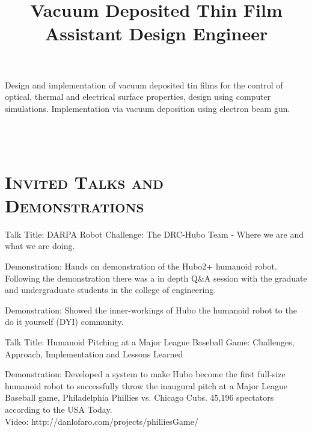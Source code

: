 \begin{resume}
\title{Vacuum Deposited Thin Film Assistant Design Engineer}
\begin{position}
Design and implementation of vacuum deposited tin films for the control of optical, thermal and electrical surface
properties, design using computer simulations.  Implementation via vacuum deposition using electron beam gun.
\end{position}


\begin{formatb}
  \\
  \body\\
\end{formatb}

\section{\textsc{Invited Talks and Demonstrations}}

\begin{position}
Talk Title: DARPA Robot Challenge: The DRC-Hubo Team - Where we are and what we are doing.
\end{position}

\begin{position}
Demonstration: Hands on demonstration of the Hubo2+ humanoid robot.  Following the demonstration there was a in depth Q\&A session with the graduate and undergraduate students in the college of engineering. 
\end{position}

\begin{position}
Demonstration: Showed the inner-workings of Hubo the humanoid robot to the do it yourself (DYI) community. 
\end{position}



\begin{position}
Talk Title: Humanoid Pitching at a Major League Baseball Game: Challenges, Approach, Implementation and Lessons Learned
\end{position}



\begin{position}
Demonstration: Developed a system to make Hubo become the first full-size humanoid robot to successfully throw the inaugural pitch at a Major League Baseball game, Philadelphia Phillies vs. Chicago Cubs.
45,196 spectators according to the USA Today.\\
Video: http://danlofaro.com/projects/philliesGame/
\end{position}




\end{resume}
